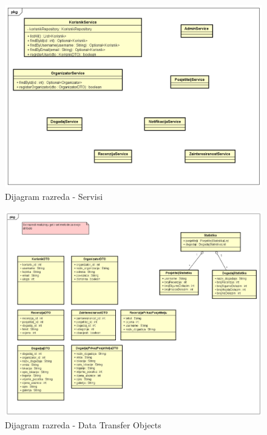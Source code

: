 			\begin{figure}[H]
				\includegraphics[scale=0.5]{dijagramiKlasa/Dijagram razreda - Servisi.png} %
				\centering
				\caption{Dijagram razreda - Servisi}
				\label{fig:promjene}
			\end{figure}
			
			\begin{figure}[H]
				\includegraphics[scale=0.4]{dijagramiKlasa/Dijagram razreda - DTO.png} %
				\centering
				\caption{Dijagram razreda - Data Transfer Objects}
				\label{fig:promjene}
			\end{figure}
			
